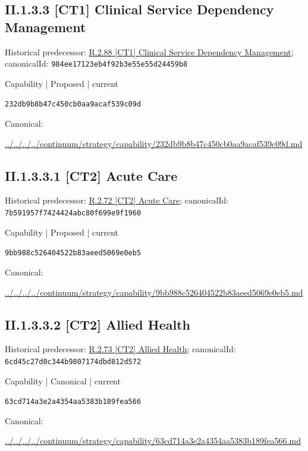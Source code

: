 \documentclass[10pt,a4paper]{article}
\begin{document}
\subsection*{II.1.3.3 [CT1] Clinical Service Dependency Management}
Historical predecessor: \hyperref[element-984ee17123eb4f92b3e55e55d24459b8]{R.2.88 [CT1] Clinical Service Dependency Management}; canonicalId: \texttt{984ee17123eb4f92b3e55e55d24459b8}\par
\label{element-232db9b8b47c450cb0aa9acaf539c09d}
{\small Capability | Proposed | current}\par
\texttt{232db9b8b47c450cb0aa9acaf539c09d}\par
Canonical: \par
{\footnotesize\url{../../../../continuum/strategy/capability/232db9b8b47c450cb0aa9acaf539c09d.md}}\par
\subsection*{II.1.3.3.1 [CT2] Acute Care}
Historical predecessor: \hyperref[element-7b591957f7424424abc80f699e9f1960]{R.2.72 [CT2] Acute Care}; canonicalId: \texttt{7b591957f7424424abc80f699e9f1960}\par
\label{element-9bb988c526404522b83aeed5069e0eb5}
{\small Capability | Proposed | current}\par
\texttt{9bb988c526404522b83aeed5069e0eb5}\par
Canonical: \par
{\footnotesize\url{../../../../continuum/strategy/capability/9bb988c526404522b83aeed5069e0eb5.md}}\par
\subsection*{II.1.3.3.2 [CT2] Allied Health}
Historical predecessor: \hyperref[element-6cd45c27d0c344b9807174dbd812d572]{R.2.73 [CT2] Allied Health}; canonicalId: \texttt{6cd45c27d0c344b9807174dbd812d572}\par
\label{element-63cd714a3e2a4354aa5383b189fea566}
{\small Capability | Canonical | current}\par
\texttt{63cd714a3e2a4354aa5383b189fea566}\par
Canonical: \par
{\footnotesize\url{../../../../continuum/strategy/capability/63cd714a3e2a4354aa5383b189fea566.md}}\par
\end{document}
